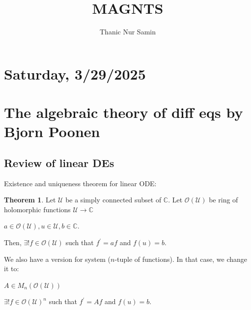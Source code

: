 \documentclass{article}
\title{MAGNTS}
\author{Thanic Nur Samin}
\theoremstyle{definition}
\newtheorem{theorem}{Theorem}
\begin{document}
    \maketitle

    \section*{Saturday, 3/29/2025}
    
    \section*{The algebraic theory of diff eqs by Bjorn Poonen}

    \subsection*{Review of linear DEs}

    Existence and uniqueness theorem for linear ODE:

    \begin{theorem}
        
        Let \(\mathcal{U}\) be a simply connected subset of \(\mathbb{C}\). Let \(\mathcal{O}(\mathcal{U})\) be ring of holomorphic functions \(\mathcal{U} \to \mathbb{C}\)

        \(a\in \mathcal{O}(\mathcal{U}), u\in \mathcal{U}, b\in \mathbb{C}\).

        Then, \(\exists ! f \in \mathcal{O} (\mathcal{U})\) such that \(f^{\prime} = af\) and \(f(u) = b\).

    \end{theorem}

    We also have a version for system (\(n\)-tuple of functions). In that case, we change it to:

    \(A\in M_n(\mathcal{O}(\mathcal{U}))\)

    \(\exists !f\in \mathcal{O}(\mathcal{U})^n\) such that \(f^{\prime} = Af\) and \(f(u) = b\).
\end{document}
